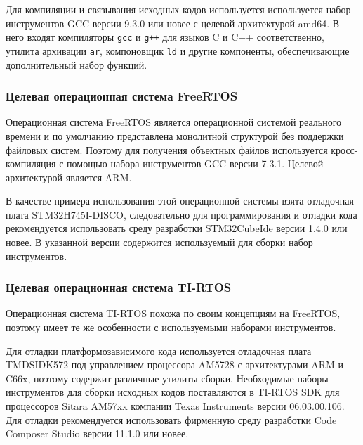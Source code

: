 Для компиляции и связывания исходных кодов используется используется
набор инструментов GCC версии 9.3.0 или новее с целевой архитектурой amd64.
В него входят компиляторы \lstinline{gcc} и \lstinline{g++} для языков C и C++ соответственно,
утилита архивации \lstinline{ar},
компоновщик \lstinline{ld} и другие компоненты, обеспечивающие дополнительный набор функций.


\subsubsection{Целевая операционная система FreeRTOS}

Операционная система FreeRTOS является операционной системой реального времени
и по умолчанию представлена монолитной структурой без поддержки файловых систем.
Поэтому для получения объектных файлов используется кросс-компиляция
с помощью набора инструментов GCC версии 7.3.1. Целевой архитектурой
является ARM.


В качестве примера использования этой операционной системы взята отладочная плата
STM32H745I-DISCO, следовательно для программирования и отладки кода рекомендуется использовать
среду разработки STM32CubeIde версии 1.4.0 или новее. В указанной версии
содержится используемый для сборки набор инструментов.

\subsubsection{Целевая операционная система TI-RTOS}

Операционная система TI-RTOS похожа по своим концепциям на FreeRTOS, поэтому
имеет те же особенности с используемыми наборами инструментов.

Для отладки платформозависимого кода используется отладочная плата TMDSIDK572
под управлением процессора AM5728 с архитектурами ARM и C66x, поэтому
содержит различные утилиты сборки.
Необходимые наборы инструментов для сборки исходных кодов поставляются
в TI-RTOS SDK для процессоров Sitara AM57xx компании Texas Instruments версии
06.03.00.106. Для отладки рекомендуется использовать фирменную среду разработки
Code Composer Studio версии 11.1.0 или новее.


